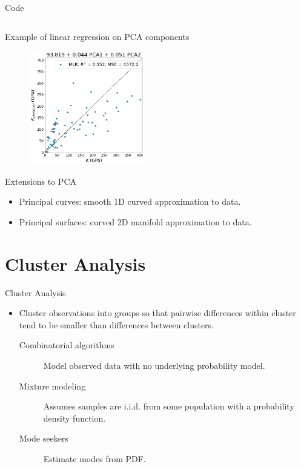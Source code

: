\documentclass[aspectratio=169]{beamer}
\begin{document}
\begin{frame}[fragile]{Code}
\inputminted{python}{example_sklearn_pca.py}
\end{frame} 


\begin{frame}{Example of linear regression on PCA components}
\begin{figure}
    \centering
    \includegraphics[width=0.45\textwidth]{figures/pca-regression.png}
\end{figure}
\end{frame} 

\begin{frame}{Extensions to PCA}
    \begin{itemize}
        \item Principal curves: smooth 1D curved approximation to data.
        \item Principal surfaces: curved 2D manifold approximation to data.
    \end{itemize}
\end{frame}

\section{Cluster Analysis}

\begin{frame}{Cluster Analysis}
    \begin{itemize}
        \item Cluster observations into groups so that pairwise differences within cluster tend to be smaller than differences between clusters.
        \begin{description}
        \item[Combinatorial algorithms] Model observed data with no underlying probability model.
        \item[Mixture modeling] Assumes samples are i.i.d. from some population with a probability density function.
        \item[Mode seekers] Estimate modes from PDF.
        \end{description}
    \end{itemize}
\end{frame}
\end{document}
